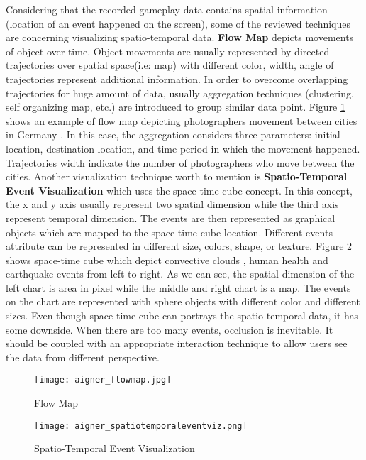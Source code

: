 Considering that the recorded gameplay data contains spatial information (location of an event happened on the screen), some of the reviewed techniques are concerning visualizing spatio-temporal data. \textbf{Flow Map} depicts movements of object over time. Object movements are usually represented by directed trajectories over spatial space(i.e: map) with different color, width, angle of trajectories represent additional information. In order to overcome overlapping trajectories for huge amount of data, usually aggregation techniques (clustering, self organizing map, etc.) are introduced to group similar data point. Figure \ref{flow_map} shows an example of flow map depicting photographers movement between cities in Germany \cite{adrienko}. In this case, the aggregation considers three parameters: initial location, destination location, and time period in which the movement happened. Trajectories width indicate the number of photographers who move between the cities. Another visualization technique worth to mention is \textbf{Spatio-Temporal Event Visualization} which uses the space-time cube concept. In this concept, the x and y axis usually represent two spatial dimension while the third axis represent temporal dimension. The events are then represented as graphical objects which are mapped to the space-time cube location. Different events attribute can be represented in different size, colors, shape, or texture. Figure \ref{spatio_temporal} shows space-time cube which depict convective clouds \cite{turdukulov}, human health \cite{tominski} and earthquake events \cite{gatalsky} from left to right. As we can see, the  spatial dimension of the left chart is area in pixel while the middle and right chart is a map. The events on the chart are represented with sphere objects with different color and different sizes. Even though space-time cube can portrays the spatio-temporal data, it has some downside. When there are too many events, occlusion is inevitable. It should be coupled with an appropriate interaction technique to allow users see the data from different perspective.

\begin{figure}
\centering
\texttt{[image: aigner\_flowmap.jpg]}
\caption{Flow Map}
\label{flow_map}
\end{figure}

\begin{figure}
\centering
\texttt{[image: aigner\_spatiotemporaleventviz.png]}
\caption{Spatio-Temporal Event Visualization}
\label{spatio_temporal}
\end{figure}

